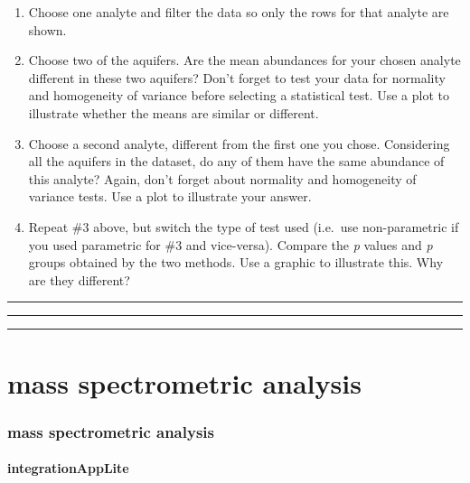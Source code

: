 \documentclass[
]{krantz}
\begin{document}
\begin{enumerate}
\def\labelenumi{\arabic{enumi}.}
\item
  Choose one analyte and filter the data so only the rows for that analyte are shown.
\item
  Choose two of the aquifers. Are the mean abundances for your chosen analyte different in these two aquifers? Don't forget to test your data for normality and homogeneity of variance before selecting a statistical test. Use a plot to illustrate whether the means are similar or different.
\item
  Choose a second analyte, different from the first one you chose. Considering all the aquifers in the dataset, do any of them have the same abundance of this analyte? Again, don't forget about normality and homogeneity of variance tests. Use a plot to illustrate your answer.
\item
  Repeat \#3 above, but switch the type of test used (i.e.~use non-parametric if you used parametric for \#3 and vice-versa). Compare the \emph{p} values and \emph{p} groups obtained by the two methods. Use a graphic to illustrate this. Why are they different?
\end{enumerate}

\begin{center}\rule{0.5\linewidth}{0.5pt}\end{center}

\begin{center}\rule{0.5\linewidth}{0.5pt}\end{center}

\begin{center}\rule{0.5\linewidth}{0.5pt}\end{center}

\hypertarget{part-mass-spectrometric-analysis}{%
\part{mass spectrometric analysis}\label{part-mass-spectrometric-analysis}}

\hypertarget{mass-spectrometric-analysis}{%
\section{mass spectrometric analysis}\label{mass-spectrometric-analysis}}

\hypertarget{integrationapplite}{%
\subsection{integrationAppLite}\label{integrationapplite}}
\end{document}
